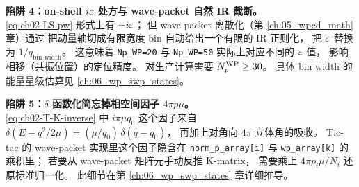 \begin{pitfallbox}
\textbf{陷阱 4：on-shell $i\varepsilon$ 处方与 wave-packet 自然 IR 截断。}\\
\cref{eq:ch02-LS-pw} 形式上有 $+i\varepsilon$；
但 wave-packet 离散化（第 \ref{ch:05_wpcd_math} 章）通过
把动量轴切成有限宽度 bin 自动给出一个有限的 IR 正则化，
把 $\varepsilon$ 替换为 $1/q_{\text{bin width}}$。
这意味着 \texttt{Np\_WP=20} 与 \texttt{Np\_WP=50} 实际上对应不同的 $\varepsilon$ 值，
影响相移（共振位置）的定位精度。
对生产计算需要 ${N_{p}^{\text{WP}}} \ge 30$。
具体 bin width 的能量量级估算见 \cref{ch:06_wp_swp_states}。
\end{pitfallbox}

\begin{pitfallbox}
\textbf{陷阱 5：$\delta$ 函数化简忘掉相空间因子 $4\pi p \mu$。}\\
\cref{eq:ch02-T-K-inverse} 中 $i\pi\mu q_0$ 这个因子来自
$\delta(E - q^2/2\mu) = (\mu/q_0)\, \delta(q - q_0)$，
再加上对角向 $4\pi$ 立体角的吸收。
Tic-tac 的 wave-packet 实现里这个因子隐含在
\texttt{norm\_p\_array[i]} 与 \texttt{wp\_array[k]} 的乘积里；
若要从 wave-packet 矩阵元手动反推 K-matrix，
需要乘上 $4\pi p_i \mu / N_i$ 还原标准归一化。
此细节在第 \ref{ch:06_wp_swp_states} 章详细推导。
\end{pitfallbox}
